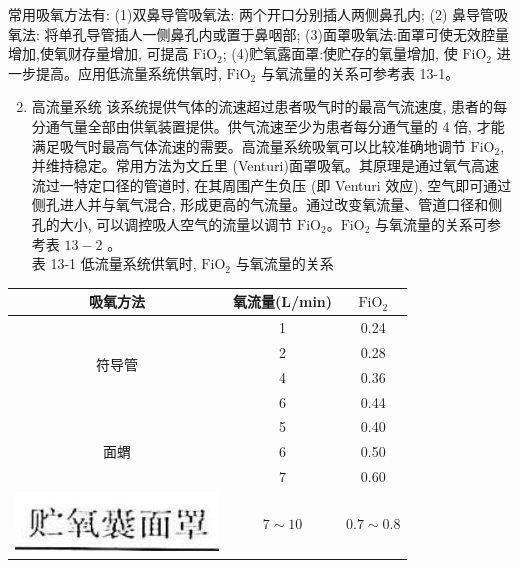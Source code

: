 \documentclass[10pt]{article}
\begin{document}
常用吸氧方法有: (1)双鼻导管吸氧法: 两个开口分别插人两侧鼻孔内; (2) 鼻导管吸氧法: 将单孔导管插人一侧鼻孔内或置于鼻咽部; (3)面罩吸氧法:面罩可使无效腔量增加,使氧财存量增加, 可提高 $\mathrm{FiO}_{2}$; (4)贮氧露面罩:使贮存的氧量增加, 使 $\mathrm{FiO}_{2}$ 进一步提高。应用低流量系统供氧时, $\mathrm{FiO}_{2}$ 与氧流量的关系可参考表 13-1。

\begin{enumerate}
  \setcounter{enumi}{1}
  \item 高流量系统 该系统提供气体的流速超过患者吸气时的最高气流速度, 患者的每分通气量全部由供氧装置提供。供气流速至少为患者每分通气量的 4 倍, 才能满足吸气时最高气体流速的需要。高流量系统吸氧可以比较准确地调节 $\mathrm{FiO}_{2}$, 并维持稳定。常用方法为文丘里 (Venturi)面罩吸氧。其原理是通过氧气高速流过一特定口径的管道时, 在其周围产生负压 (即 Venturi 效应), 空气即可通过侧孔进人并与氧气混合, 形成更高的气流量。通过改变氧流量、管道口径和侧孔的大小, 可以调控吸人空气的流量以调节 $\mathrm{FiO}_{2} 。 \mathrm{FiO}_{2}$ 与氧流量的关系可参考表 $13-2$ 。\\
表 13-1 低流量系统供氧时, $\mathrm{FiO}_{2}$ 与氧流量的关系
\end{enumerate}

\begin{center}
\begin{tabular}{|c|c|c|}
\hline
吸氧方法 & 氧流量(L/min) & $\mathrm{FiO}_{2}$ \\
\hline
\multirow[t]{4}{*}{符导管} & 1 & 0.24 \\
\hline
 & 2 & 0.28 \\
\hline
 & 4 & 0.36 \\
\hline
 & 6 & 0.44 \\
\hline
\multirow[t]{3}{*}{面蝟} & 5 & 0.40 \\
\hline
 & 6 & 0.50 \\
\hline
 & 7 & 0.60 \\
\hline
\includegraphics[max width=\textwidth]{2024_07_09_002a177993bd97d1d6d7g-140}
 & $7 \sim 10$ & $0.7 \sim 0.8$ \\
\hline
\end{tabular}
\end{center}
\end{document}
